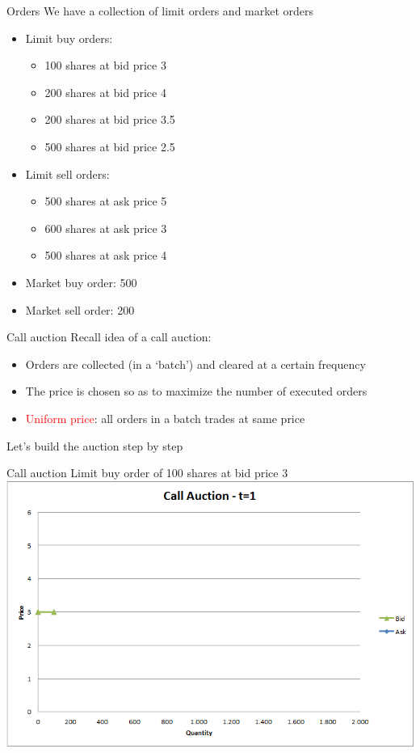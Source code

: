 \documentclass[english,10pt]{beamer}
\theoremstyle{definition}
\begin{document}
\begin{frame}{Orders}
	We have a collection of limit orders and market orders
	\begin{itemize}
		\item Limit buy orders:
		\begin{itemize}
			\item 100 shares at bid price 3
			\item 200 shares at bid price 4
			\item 200 shares at bid price 3.5
			\item 500 shares at bid price 2.5
		\end{itemize}
		\item Limit sell orders:
		\begin{itemize}
			\item 500 shares at ask price 5
			\item 600 shares at ask price 3
			\item 500 shares at ask price 4
		\end{itemize}
		\item Market buy order: 500
		\item Market sell order: 200
	\end{itemize}
\end{frame}


\begin{frame}{Call auction}
	Recall idea of a call auction:
	\begin{itemize}
		\item Orders are collected (in a `batch') and cleared at a certain frequency
		\item The price is chosen so as to maximize the number of executed orders
		\item \textcolor{red}{Uniform price}: all orders in a batch trades at same price
	\end{itemize}
	\quad
	Let's build the auction step by step
\end{frame}


\begin{frame}{Call auction}
	Limit buy order of 100 shares at bid price 3
	\quad
	\center
	\includegraphics[width=.75\linewidth]{pics/Call_t1}
\end{frame}
\end{document}
